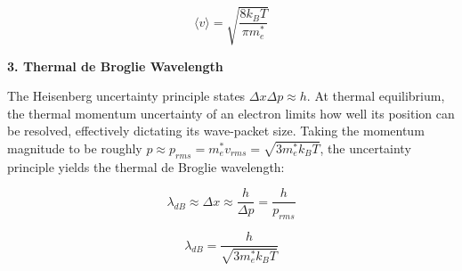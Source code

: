 \begin{equation*}
  \boxed{\langle v \rangle = \sqrt{\frac{8 k_B T}{\pi m_e^*}}}
\end{equation*}

\textbf{3. Thermal de Broglie Wavelength}

The Heisenberg uncertainty principle states $\Delta x \Delta p \approx h$. At thermal equilibrium, the thermal momentum uncertainty of an electron limits how well its position can be resolved, effectively dictating its wave-packet size. Taking the momentum magnitude to be roughly $p \approx p_{rms} = m_e^* v_{rms} = \sqrt{3 m_e^* k_B T}$, the uncertainty principle yields the thermal de Broglie wavelength:

\begin{equation*}
  \lambda_{dB} \approx \Delta x \approx \frac{h}{\Delta p} = \frac{h}{p_{rms}}
\end{equation*}

\begin{equation*}
  \boxed{\lambda_{dB} = \frac{h}{\sqrt{3 m_e^* k_B T}}}
\end{equation*}
